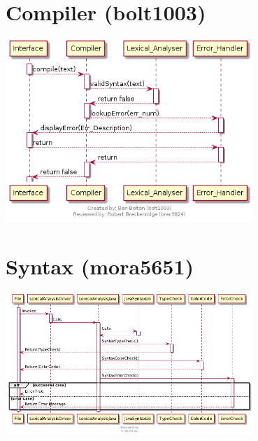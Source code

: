 \documentclass[11pt]{report}
\begin{document}
\section{Compiler (bolt1003)}
    \begin{minipage}{1\textwidth}
        \begin{center}
            \includegraphics[width=0.7\textwidth]{diagrams/sequence-compiler}
        \end{center}
    \end{minipage}
    
\section{Syntax (mora5651)}
    \begin{minipage}{1\textwidth}
        \begin{center}
            \includegraphics[width=0.7\textwidth]{diagrams/sequence-syntax}
        \end{center}
    \end{minipage}
    
\end{document}
